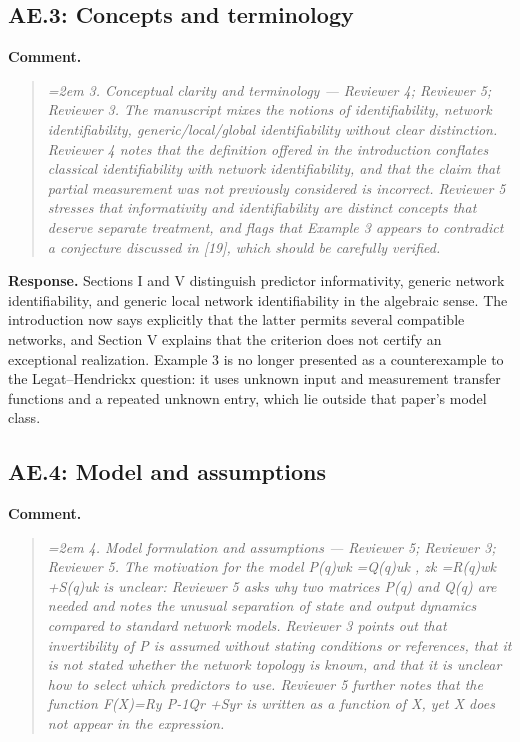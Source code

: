 \documentclass[11pt]{article}
\begin{document}
\subsection*{AE.3: Concepts and terminology}
\textbf{Comment.}
\begin{quote}\itshape\emergencystretch=2em
3. Conceptual clarity and terminology --- Reviewer 4; Reviewer 5; Reviewer 3. The manuscript mixes the notions of identifiability, network identifiability, generic/local/global identifiability without clear distinction. Reviewer 4 notes that the definition offered in the introduction conflates classical identifiability with network identifiability, and that the claim that partial measurement was not previously considered is incorrect. Reviewer 5 stresses that informativity and identifiability are distinct concepts that deserve separate treatment, and flags that Example 3 appears to contradict a conjecture discussed in [19], which should be carefully verified.
\end{quote}

\textbf{Response.} Sections I and V distinguish predictor informativity, generic network identifiability, and generic local network identifiability in the algebraic sense. The introduction now says explicitly that the latter permits several compatible networks, and Section V explains that the criterion does not certify an exceptional realization. Example 3 is no longer presented as a counterexample to the Legat--Hendrickx question: it uses unknown input and measurement transfer functions and a repeated unknown entry, which lie outside that paper's model class.

\subsection*{AE.4: Model and assumptions}
\textbf{Comment.}
\begin{quote}\itshape\emergencystretch=2em
4. Model formulation and assumptions --- Reviewer 5; Reviewer 3; Reviewer 5. The motivation for the model P(q)wk =Q(q)uk , zk =R(q)wk +S(q)uk is unclear: Reviewer 5 asks why two matrices P(q) and Q(q) are needed and notes the unusual separation of state and output dynamics compared to standard network models. Reviewer 3 points out that invertibility of P is assumed without stating conditions or references, that it is not stated whether the network topology is known, and that it is unclear how to select which predictors to use. Reviewer 5 further notes that the function F(X)=Ry P-1Qr +Syr is written as a function of X, yet X does not appear in the expression.
\end{quote}
\end{document}
